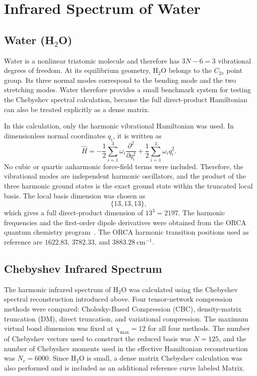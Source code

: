 \section{Infrared Spectrum of Water}
\label{sec:h2o_ir_spectrum}

\subsection{Water (H$_2$O)}
\label{subsec:h2o}

Water is a nonlinear triatomic molecule and therefore has
\(3N-6=3\) vibrational degrees of freedom. At its equilibrium geometry,
H$_2$O belongs to the \(C_{2v}\) point group. Its three normal modes
correspond to the bending mode and the two stretching modes. Water therefore
provides a small benchmark system for testing the Chebyshev spectral
calculation, because the full direct-product Hamiltonian can also be treated
explicitly as a dense matrix.

In this calculation, only the harmonic vibrational Hamiltonian was used. In
dimensionless normal coordinates \(q_i\), it is written as
\begin{equation}
    \hat{H}
    =
    -\frac{1}{2}
    \sum_{i=1}^{3}
    \omega_i
    \frac{\partial^2}{\partial q_i^2}
    +
    \frac{1}{2}
    \sum_{i=1}^{3}
    \omega_i q_i^2 .
    \label{eq:h2o_harmonic_vibrational_hamiltonian}
\end{equation}
No cubic or quartic anharmonic force-field terms were included. Therefore,
the vibrational modes are independent harmonic oscillators, and the product
of the three harmonic ground states is the exact ground state within the
truncated local basis. The local basis dimension was chosen as
\begin{equation}
    \{13,13,13\},
    \label{eq:h2o_local_dimensions}
\end{equation}
which gives a full direct-product dimension of \(13^3=2197\). The harmonic
frequencies and the first-order dipole derivatives were obtained from the
ORCA quantum chemistry program~\cite{Neese2025ORCA6}. The ORCA harmonic
transition positions used as reference are
\(1622.83\), \(3782.33\), and \(3883.28~\mathrm{cm}^{-1}\).

\subsection{Chebyshev Infrared Spectrum}
\label{subsec:h2o_chebyshev_spectrum}

The harmonic infrared spectrum of H$_2$O was calculated using the Chebyshev
spectral reconstruction introduced above. Four tensor-network compression
methods were compared: Cholesky-Based Compression (CBC), density-matrix
truncation (DM), direct truncation, and variational compression. The maximum
virtual bond dimension was fixed at \(\chi_{\max}=12\) for all four methods.
The number of Chebyshev vectors used to construct the reduced basis was
\(N=125\), and the number of Chebyshev moments used in the effective
Hamiltonian reconstruction was \(N_r=6000\). Since H$_2$O is small, a dense
matrix Chebyshev calculation was also performed and is included as an
additional reference curve labeled Matrix.


